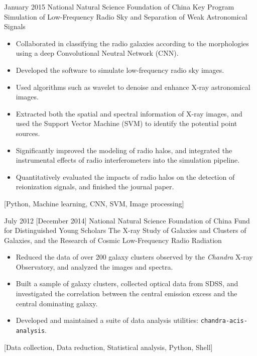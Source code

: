 \documentclass{resume}
\begin{document}
\begin{projects}
  \project
    {January 2015}%
    {National Natural Science Foundation of China}%
    {Key Program}%
    {Simulation of Low-Frequency Radio Sky and Separation of Weak
     Astronomical Signals}%
    {\begin{itemize}
      \item Collaborated in classifying the radio galaxies according to
        the morphologies using a deep Convolutional Neutral Network (CNN).
      \item Developed the
        software to simulate low-frequency radio sky images.
      \item Used algorithms such as wavelet to denoise and enhance X-ray
        astronomical images.
      \item Extracted both the spatial and spectral information of X-ray
        images, and used the Support Vector Machine (SVM) to identify the
        potential point sources.
      \item Significantly improved the modeling of radio halos,
        and integrated the instrumental effects of radio interferometers
        into the simulation pipeline.
      \item Quantitatively evaluated the impacts of radio halos on the
        detection of reionization signals, and finished the journal paper.
    \end{itemize}}%
    [Python, Machine learning, CNN, SVM, Image processing]

  \separator{0.7em}
  \project
    {July 2012}%
    [December 2014]%
    {National Natural Science Foundation of China}%
    {Fund for Distinguished Young Scholars}%
    {The X-ray Study of Galaxies and Clusters of Galaxies,
      and the Research of Cosmic Low-Frequency Radio Radiation}%
    {\begin{itemize}
      \item Reduced the data of over 200 galaxy clusters observed by the
        \textit{Chandra} X-ray Observatory, and analyzed the images and
        spectra.
      \item Built a sample of galaxy clusters, collected optical data from
        SDSS, and investigated the correlation between the central emission
        excess and the central dominating galaxy.
      \item Developed and maintained a suite of data analysis utilities:
          {\texttt{chandra-acis-analysis}}.
    \end{itemize}}%
    [Data collection, Data reduction, Statistical analysis, Python, Shell]
\end{projects}
\end{document}
